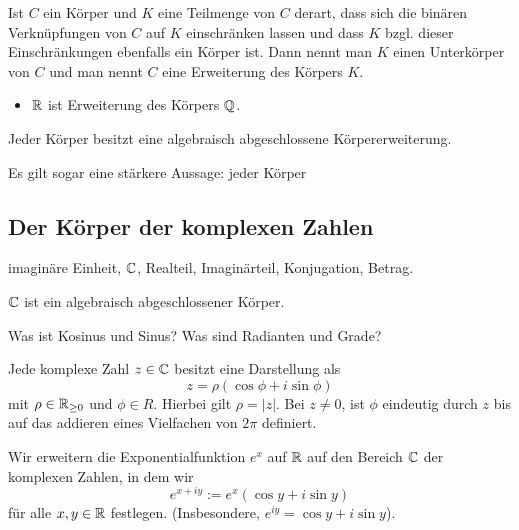 \begin{defn}
	Ist $C$ ein Körper und $K$ eine Teilmenge von $C$ derart, dass  sich die binären Verknüpfungen von $C$  auf $K$ einschränken lassen und dass $K$ bzgl. dieser Einschränkungen ebenfalls ein Körper ist. Dann nennt man $K$ einen Unterkörper von $C$ und man nennt $C$ eine Erweiterung des Körpers $K$. 
\end{defn} 

\begin{bsp}
	\begin{itemize}
		\item $\mathbb{R}$ ist Erweiterung des Körpers $\mathbb{Q}$. 
	\end{itemize} 
\end{bsp} 

\begin{thm}
	Jeder Körper besitzt eine algebraisch abgeschlossene Körpererweiterung. 	
\end{thm} 

\begin{bem}
	Es gilt sogar eine stärkere Aussage: jeder Körper 
\end{bem} 


\subsection{Der Körper der komplexen Zahlen} 

\begin{defn}
	imaginäre Einheit, $\mathbb{C}$, Realteil, Imaginärteil, Konjugation, Betrag. 
\end{defn} 

\begin{thm}
		$\mathbb{C}$ ist ein algebraisch abgeschlossener Körper. 
\end{thm}

\begin{bem}
	Was ist Kosinus und Sinus? Was sind Radianten und Grade? 
\end{bem} 

\begin{thm}
	Jede komplexe Zahl $z \in \mathbb{C}$ besitzt eine Darstellung als 
	\[
		z = \rho ( \cos \phi + i \sin \phi )
	\]
	mit $\rho \in \mathbb{R}_{\ge 0}$ und $\phi \in R$. Hierbei gilt $\rho = |z|$. Bei $z \ne 0$, ist $\phi$ eindeutig durch $z$ bis auf das addieren eines Vielfachen von $2 \pi$ definiert. 
\end{thm}

\begin{defn}
	Wir erweitern die Exponentialfunktion $e^x$ auf $\mathbb{R}$ auf den Bereich $\mathbb{C}$ der komplexen Zahlen, in dem wir 
	\[
		e^{x+ i y} := e^x ( \cos y + i \sin y)
	\]
	für alle $x, y \in \mathbb{R}$ festlegen. (Insbesondere, $e^{i y} = \cos y + i \sin y$). 
\end{defn} 

